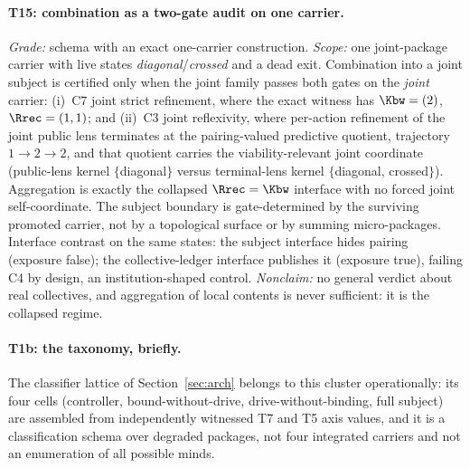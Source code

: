 \paragraph{T15: combination as a two-gate audit on one carrier.}
\begin{theorem}
\gradeS{} \emph{Grade:} schema with an exact one-carrier construction.
\emph{Scope:} one joint-package carrier with live states
\emph{diagonal}/\emph{crossed} and a dead exit. Combination into a joint
subject is certified only when the joint family passes both gates on the
\emph{joint} carrier: (i)~C7 joint strict refinement, where the exact witness has
$\Kbw = (2)$, $\Rrec = (1,1)$; and (ii)~C3 joint reflexivity, where per-action
refinement of the joint public lens terminates at the pairing-valued
predictive quotient, trajectory $1 \to 2 \to 2$, and that quotient carries the
viability-relevant joint coordinate (public-lens kernel $\{$diagonal$\}$
versus terminal-lens kernel $\{$diagonal, crossed$\}$). Aggregation is
exactly the collapsed $\Rrec = \Kbw$ interface with no forced joint
self-coordinate. The subject boundary is gate-determined by the surviving
promoted carrier, not by a topological surface or by summing micro-packages.
Interface contrast on the same states: the subject interface hides pairing
(exposure false); the collective-ledger interface publishes it (exposure
true), failing C4 by design, an institution-shaped control.
\emph{Nonclaim:} no general verdict about real collectives, and aggregation
of local contents is never sufficient: it is the collapsed regime.
\end{theorem}

\paragraph{T1b: the taxonomy, briefly.}
The classifier lattice of Section~\ref{sec:arch} belongs to this cluster
operationally: its four cells (controller, bound-without-drive,
drive-without-binding, full subject) are assembled from independently
witnessed T7 and T5 axis values, and it is a classification schema over
degraded packages, not four integrated carriers and not an enumeration of
all possible minds.

